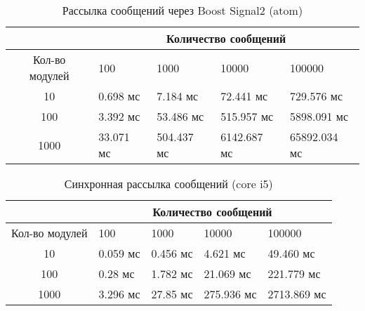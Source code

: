 \begin{table}[htb]
    \caption{\label{tab:atom_signals2}Рассылка сообщений через Boost Signal2 (atom)}
    \begin{center}
        \begin{tabularx}{\textwidth}{|c|X|X|X|X|}
            \hline
            & \multicolumn{4}{|c|}{Количество сообщений} \\
            \hline
            Кол-во модулей & 100   & 1000   & 10000   & 100000   \\
            \hline
            10             & 0.698 мс  & 7.184 мс  & 72.441 мс & 729.576 мс   \\
            \hline
            100            & 3.392 мс  & 53.486 мс  & 515.957 мс  & 5898.091 мс  \\
            \hline
            1000           & 33.071 мс & 504.437 мс & 6142.687 мс & 65892.034 мс \\
            \hline
        \end{tabularx}
    \end{center}
\end{table}


\begin{table}[htb]
    \caption{\label{tab:core_rrc_old}Синхронная рассылка сообщений (core i5)}
    \begin{center}
        \begin{tabularx}{\textwidth}{|c|X|X|X|X|}
            \hline
            & \multicolumn{4}{|c|}{Количество сообщений} \\
            \hline
            Кол-во модулей & 100   & 1000   & 10000   & 100000   \\
            \hline
            10             & 0.059 мс  & 0.456 мс   & 4.621 мс   & 49.460 мс   \\
            \hline
            100            & 0.28 мс  & 1.782 мс  & 21.069 мс  & 221.779 мс  \\
            \hline
            1000           & 3.296 мс & 27.85 мс & 275.936 мс & 2713.869 мс \\
            \hline
        \end{tabularx}
    \end{center}
\end{table}

